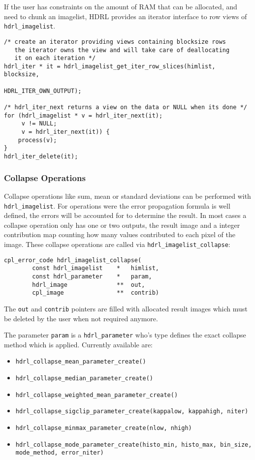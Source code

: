 If the user has constraints on the amount of RAM that can be
allocated, and need to chunk an imagelist, HDRL
provides an iterator interface to row views of \verb+hdrl_imagelist+.

\begin{lstlisting}
/* create an iterator providing views containing blocksize rows
   the iterator owns the view and will take care of deallocating
   it on each iteration */
hdrl_iter * it = hdrl_imagelist_get_iter_row_slices(himlist, blocksize,
                                                    HDRL_ITER_OWN_OUTPUT);

/* hdrl_iter_next returns a view on the data or NULL when its done */
for (hdrl_imagelist * v = hdrl_iter_next(it);
     v != NULL;
     v = hdrl_iter_next(it)) {
    process(v);
}
hdrl_iter_delete(it);
\end{lstlisting}

\subsubsection{Collapse Operations}
\label{sec:imagelist:collapsing}

Collapse operations like sum, mean or standard deviations can be
performed with \verb+hdrl_imagelist+. For operations were the error
propagation formula is well defined,
the errors will be accounted for to determine the result.  In most cases a
collapse operation only has one or two outputs, the result image and a
integer contribution map counting how many values contributed to each
pixel of the image. These collapse operations are called via
\verb+hdrl_imagelist_collapse+:
\begin{lstlisting}
cpl_error_code hdrl_imagelist_collapse(
        const hdrl_imagelist    *   himlist,
        const hdrl_parameter    *   param,
        hdrl_image              **  out,
        cpl_image               **  contrib)
\end{lstlisting}
The \verb+out+ and \verb+contrib+ pointers are filled with allocated result
images which must be deleted by the user when not required anymore.

The parameter \verb+param+ is a \verb+hdrl_parameter+ who's type
defines the exact collapse method which is applied.  Currently
available are:
\begin{itemize}
\item \verb+hdrl_collapse_mean_parameter_create()+
\item \verb+hdrl_collapse_median_parameter_create()+
\item \verb+hdrl_collapse_weighted_mean_parameter_create()+
\item \verb+hdrl_collapse_sigclip_parameter_create(kappalow, kappahigh, niter)+
\item \verb+hdrl_collapse_minmax_parameter_create(nlow, nhigh)+
\item \verb+hdrl_collapse_mode_parameter_create(histo_min, histo_max, bin_size,+\\
\verb+mode_method, error_niter)+
\end{itemize}

